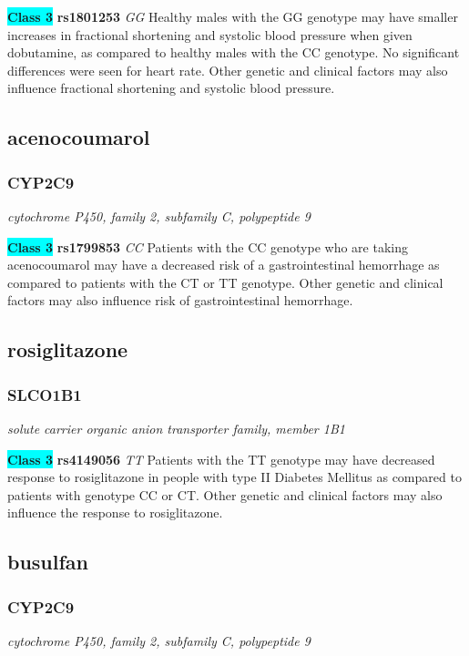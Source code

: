 \documentclass{report}
\begin{document}
\textbf{\colorbox{cyan} {Class 3}} \textbf{ rs1801253 } \textit{ GG }
Healthy males with the GG genotype may have smaller increases in fractional shortening and systolic blood pressure when given dobutamine, as compared to healthy males with the CC genotype. No significant differences were seen for heart rate. Other genetic and clinical factors may also influence fractional shortening and systolic blood pressure.\newline\subsection{ acenocoumarol }\subsubsection{ CYP2C9 }
\textit{ cytochrome P450, family 2, subfamily C, polypeptide 9 }

\textbf{\colorbox{cyan} {Class 3}} \textbf{ rs1799853 } \textit{ CC }
Patients with the CC genotype who are taking acenocoumarol may have a decreased risk of a gastrointestinal hemorrhage as compared to patients with the CT or TT genotype. Other genetic and clinical factors may also influence risk of gastrointestinal hemorrhage.\newline\subsection{ rosiglitazone }\subsubsection{ SLCO1B1 }
\textit{ solute carrier organic anion transporter family, member 1B1 }

\textbf{\colorbox{cyan} {Class 3}} \textbf{ rs4149056 } \textit{ TT }
Patients with the TT genotype may have decreased response to rosiglitazone in people with type II Diabetes Mellitus as compared to patients with genotype CC or CT. Other genetic and clinical factors may also influence the response to rosiglitazone.\newline\subsection{ busulfan }\subsubsection{ CYP2C9 }
\textit{ cytochrome P450, family 2, subfamily C, polypeptide 9 }
\end{document}
